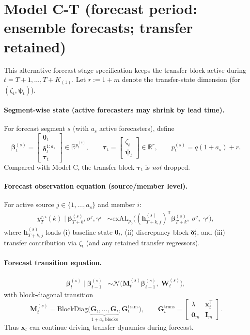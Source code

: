 \documentclass[11pt]{article}
\newcommand{\R}{\mathbb{R}}
\newcommand{\1}{\mathbb{I}}
\newcommand{\N}{\mathcal{N}}
\newcommand{\BlockDiag}{\mathrm{BlockDiag}}
\newcommand{\T}{\mathsf{T}}
\begin{document}
\section{Model C-T (forecast period: ensemble forecasts; transfer retained)}
\label{sec:model_c_transfer_retained}

This alternative forecast-stage specification keeps the transfer block active during
$t=T+1,\dots,T+K_{(1)}$.
Let $r:=1+m$ denote the transfer-state dimension (for $(\zeta_t,\bm\psi_t)$).

\paragraph{Segment-wise state (active forecasters may shrink by lead time).}
For forecast segment $s$ (with $a_s$ active forecasters), define
\[
\bm\beta_t^{(s)}=
\begin{bmatrix}
\bm\theta_t\\
\bm\delta_t^{1:a_s}\\
\bm\tau_t
\end{bmatrix}
\in\R^{p_t^{(s)}},
\qquad
\bm\tau_t=
\begin{bmatrix}
\zeta_t\\
\bm\psi_t
\end{bmatrix}\in\R^r,
\qquad
p_t^{(s)}=q(1+a_s)+r.
\]
Compared with Model C, the transfer block $\bm\tau_t$ is \emph{not} dropped.

\paragraph{Forecast observation equation (source/member level).}
For active source $j\in\{1,\dots,a_s\}$ and member $i$:
\begin{align}
y_T^{j,i}(k)\mid \bm\beta_{T+k}^{(s)},\sigma^j,\gamma^j
&\sim \mathrm{exAL}_{p_0}\!\big((\bm h_{T+k,j}^{(s)})^\T\bm\beta_{T+k}^{(s)},\;\sigma^j,\;\gamma^j\big),
\end{align}
where $\bm h_{T+k,j}^{(s)}$ loads (i) baseline state $\bm\theta_t$, (ii) discrepancy block $\bm\delta_t^j$,
and (iii) transfer contribution via $\zeta_t$ (and any retained transfer regressors).

\paragraph{Forecast transition equation.}
\begin{align}
\bm\beta_t^{(s)}\mid \bm\beta_{t-1}^{(s)}
&\sim \N\!\big(\bm M_t^{(s)}\bm\beta_{t-1}^{(s)},\;\bm W_t^{(s)}\big),\label{eq:CT_state}
\end{align}
with block-diagonal transition
\[
\bm M_t^{(s)}=
\BlockDiag\!\big(
\underbrace{\bm G_t,\dots,\bm G_t}_{1+a_s\ \text{blocks}},
\bm G_t^{\mathrm{trans}}
\big),
\qquad
\bm G_t^{\mathrm{trans}}=
\begin{bmatrix}
\lambda & \bm x_t^\T\\
\bm 0_m & \bm I_m
\end{bmatrix}.
\]
Thus $\bm x_t$ can continue driving transfer dynamics during forecast.
\end{document}
